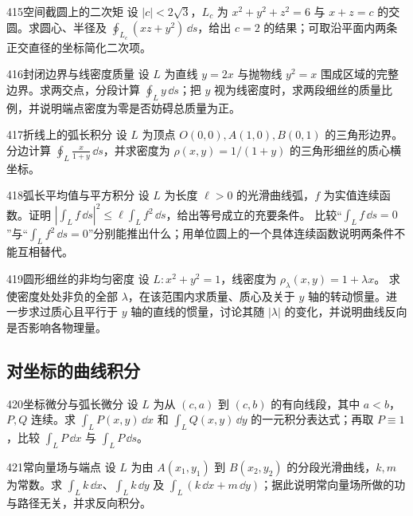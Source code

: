 \begin{exercise}{415}{空间截圆上的二次矩}
设 $|c|<2\sqrt3$，$L_c$ 为 $x^2+y^2+z^2=6$ 与 $x+z=c$ 的交圆。求圆心、半径及 $\oint_{L_c}(xz+y^2)\,\dd s$，给出 $c=2$ 的结果；可取沿平面内两条正交直径的坐标简化二次项。
\end{exercise}

\begin{exercise}{416}{封闭边界与线密度质量}
设 $L$ 为直线 $y=2x$ 与抛物线 $y^2=x$ 围成区域的完整边界。求两交点，分段计算 $\oint_Ly\,\dd s$；把 $y$ 视为线密度时，求两段细丝的质量比例，并说明端点密度为零是否妨碍总质量为正。
\end{exercise}

\begin{exercise}{417}{折线上的弧长积分}
设 $L$ 为顶点 $O(0,0),A(1,0),B(0,1)$ 的三角形边界。分边计算
$\oint_L\frac{x}{1+y}\,\dd s$，并求密度为 $\rho(x,y)=1/(1+y)$ 的三角形细丝的质心横坐标。
\end{exercise}

\begin{exercise}{418}{弧长平均值与平方积分}
设 $L$ 为长度 $\ell>0$ 的光滑曲线弧，$f$ 为实值连续函数。证明
$|\int_Lf\,\dd s|^2\leq\ell\int_Lf^2\,\dd s$，给出等号成立的充要条件。
比较“$\int_Lf\,\dd s=0$”与“$\int_Lf^2\,\dd s=0$”分别能推出什么；用单位圆上的一个具体连续函数说明两条件不能互相替代。
\end{exercise}

\begin{exercise}{419}{圆形细丝的非均匀密度}
设 $L:x^2+y^2=1$，线密度为 $\rho_\lambda(x,y)=1+\lambda x$。
求使密度处处非负的全部 $\lambda$，在该范围内求质量、质心及关于 $y$ 轴的转动惯量。进一步求过质心且平行于 $y$ 轴的直线的惯量，讨论其随 $|\lambda|$ 的变化，并说明曲线反向是否影响各物理量。
\end{exercise}

\subsection{对坐标的曲线积分}

\begin{exercise}{420}{坐标微分与弧长微分}
设 $L$ 为从 $(c,a)$ 到 $(c,b)$ 的有向线段，其中 $a<b$，$P,Q$ 连续。求
$\int_LP(x,y)\,\dd x$ 和 $\int_LQ(x,y)\,\dd y$ 的一元积分表达式；再取 $P\equiv1$，比较 $\int_LP\,\dd x$ 与 $\int_LP\,\dd s$。
\end{exercise}

\begin{exercise}{421}{常向量场与端点}
设 $L$ 为由 $A(x_1,y_1)$ 到 $B(x_2,y_2)$ 的分段光滑曲线，$k,m$ 为常数。求
$\int_Lk\,\dd x$、$\int_Lk\,\dd y$ 及 $\int_L(k\,\dd x+m\,\dd y)$；据此说明常向量场所做的功与路径无关，并求反向积分。
\end{exercise}

